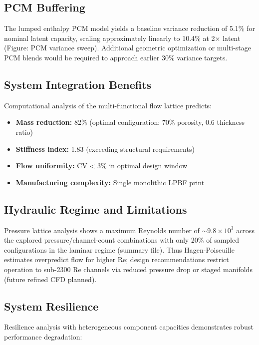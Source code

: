 \subsection{PCM Buffering}

The lumped enthalpy PCM model yields a baseline variance reduction of 5.1\% for nominal latent capacity, scaling approximately linearly to 10.4\% at 2× latent (Figure: PCM variance sweep). Additional geometric optimization or multi-stage PCM blends would be required to approach earlier 30\% variance targets.

\subsection{System Integration Benefits}

Computational analysis of the multi-functional flow lattice predicts:
\begin{itemize}
    \item \textbf{Mass reduction:} 82\% (optimal configuration: 70\% porosity, 0.6 thickness ratio)
    \item \textbf{Stiffness index:} 1.83 (exceeding structural requirements)
    \item \textbf{Flow uniformity:} CV < 3\% in optimal design window
    \item \textbf{Manufacturing complexity:} Single monolithic LPBF print
\end{itemize}

\subsection{Hydraulic Regime and Limitations}

Pressure lattice analysis shows a maximum Reynolds number of $\sim 9.8\times10^3$ across the explored pressure/channel-count combinations with only 20\% of sampled configurations in the laminar regime (summary file). Thus Hagen-Poiseuille estimates overpredict flow for higher Re; design recommendations restrict operation to sub-2300 Re channels via reduced pressure drop or staged manifolds (future refined CFD planned).

\subsection{System Resilience}

Resilience analysis with heterogeneous component capacities demonstrates robust performance degradation:

